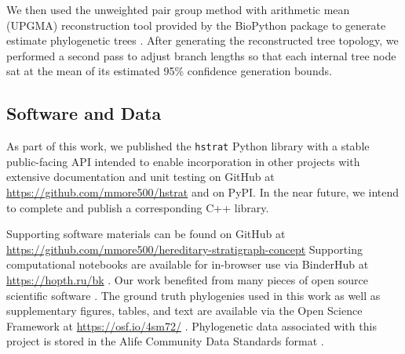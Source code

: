 We then used the unweighted pair group method with arithmetic mean (UPGMA) reconstruction tool provided by the BioPython package to generate estimate phylogenetic trees \citep{cock2009biopython,sokal1958statistical}.
After generating the reconstructed tree topology, we performed a second pass to adjust branch lengths so that each internal tree node sat at the mean of its estimated 95\% confidence generation bounds.

\subsection{Software and Data}


As part of this work, we published the \texttt{hstrat} Python library with a stable public-facing API intended to enable incorporation in other projects with extensive documentation and unit testing on GitHub at \url{https://github.com/mmore500/hstrat} and on PyPI.%
In the near future, we intend to complete and publish a corresponding C++ library.

Supporting software materials can be found on GitHub at \url{https://github.com/mmore500/hereditary-stratigraph-concept}
Supporting computational notebooks are available for in-browser use via BinderHub at \url{https://hopth.ru/bk} \citep{ragan2018binder}.
Our work benefited from many pieces of open source scientific software \citep{sukumaran2010dendropy,virtanen2020scipy,hunter2007matplotlib,virtanen2020scipy,waskom2021seaborn,bostock2011d3,meurer2017sympy,smith2020treedistdata,paradis2004ape,ushey2022reticulate,wickham2022dplyr}.
The ground truth phylogenies used in this work as well as supplementary figures, tables, and text are available via the Open Science Framework at
\url{https://osf.io/4sm72/} \citep{foster2017open,moreno2022hstratconceptsupplement}.
Phylogenetic data associated with this project is stored in the Alife Community Data Standards format \citep{lalejini2019data}.
